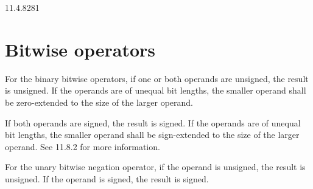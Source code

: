 \documentclass{article}
\newcommand{\del}{\color{darkred}}
\begin{document}
\setcounter{section}{7}

\begin{lrmquote}{11.4.8}{281}

  \section{Bitwise operators}

  \textelp{}

  For the binary bitwise operators, if one or both operands are unsigned, the
  result is unsigned.
    {
      \del{}
      If the operands are of unequal bit lengths, the smaller
      operand shall be zero-extended to the size of the larger operand.
    }

  If both operands are signed, the result is signed.
    {
      \del{}
      If the operands are of
      unequal bit lengths, the smaller operand shall be sign-extended to the size of
      the larger operand. See 11.8.2 for more information.
    }

  For the unary bitwise negation operator, if the operand is unsigned, the result
  is unsigned. If the operand is signed, the result is signed.

  \textelp{}
\end{lrmquote}

\renewcommand{\thesection}{11.6.\arabic{section}}
\setcounter{section}{0}
\end{document}
